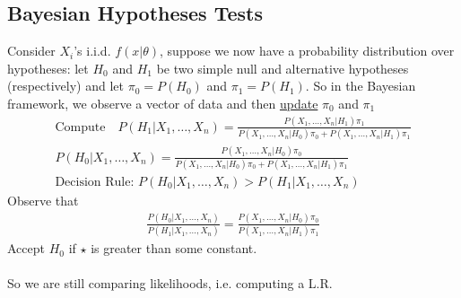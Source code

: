 \subsection*{Bayesian Hypotheses Tests}
Consider $X_i$'s i.i.d. $f(x | \theta)$, suppose we now have a probability distribution over hypotheses: let $H_0$ and $H_1$ be two simple null and alternative hypotheses (respectively) and let $\pi_0 = P(H_0)$ and $\pi_1 = P(H_1)$. So in the Bayesian framework, we observe a vector of data and then \underline{update} $\pi_0$ and $\pi_1$
\begin{gather*}
	\text{Compute} \quad P(H_1 | X_1, \ldots, X_n) = \frac{P(X_1, \ldots, X_n | H_1) \pi_1}{P(X_1, \ldots, X_n | H_0) \pi_0 + P(X_1, \ldots, X_n | H_1) \pi_1}\\
	P(H_0 | X_1, \ldots, X_n) = \frac{P(X_1, \ldots, X_n | H_0) \pi_0}{P(X_1, \ldots, X_n | H_0) \pi_0 + P(X_1, \ldots, X_n | H_1) \pi_1}\\
\text{Decision Rule: } P(H_0 | X_1, \ldots, X_n) > P(H_1 | X_1, \ldots, X_n)
\end{gather*}
Observe that
\begin{gather*}
	\frac{P(H_0 | X_1, \ldots, X_n)}{P(H_1| X_1, \ldots, X_n)} = \frac{P(X_1, \ldots, X_n | H_0) \pi_0}{P(X_1, \ldots, X_n | H_1) \pi_1}
\end{gather*}
Accept $H_0$ if $\star$ is greater than some constant.\\\\
So we are still comparing likelihoods, i.e. computing a L.R. 
